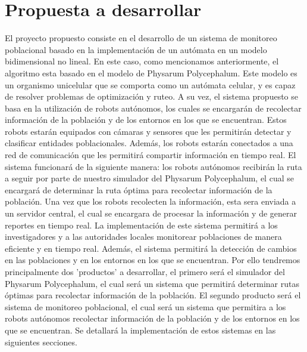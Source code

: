 \section{Propuesta a desarrollar}
\label{sec:Propuesta a desarrollar}
        El proyecto propuesto consiste en el desarrollo de un sistema de monitoreo poblacional basado en 
            la implementaci\'on de un aut\'omata en un modelo bidimensional no lineal. En este caso, 
            como mencionamos anteriormente, el algoritmo esta basado en el modelo de Physarum Polycephalum.
            Este modelo es un organismo unicelular que se comporta como un aut\'omata celular,
            y es capaz de resolver problemas de optimizaci\'on y ruteo.
        \vskip 0.5cm
        A su vez, el sistema propuesto se basa en la utilizaci\'on de robots aut\'onomos, los cuales 
            se encargar\'an de recolectar informaci\'on de la poblaci\'on y de los entornos en los que 
            se encuentran. Estos robots estar\'an equipados con c\'amaras y sensores que les permitir\'an 
            detectar y clasificar entidades poblacionales. Adem\'as, los robots estar\'an conectados a 
            una red de comunicaci\'on que les permitir\'a compartir informaci\'on en tiempo real.
        \vskip 0.5cm
        El sistema funcionar\'a de la siguiente manera: los robots aut\'onomos recibir\'an la ruta a seguir 
            por parte de nuestro simulador del Physarum Polycephalum, el cual se encargar\'a de determinar
            la ruta \'optima para recolectar informaci\'on de la poblaci\'on. Una vez que los robots
            recolecten la informaci\'on, esta sera enviada a un servidor central, el cual se encargara
            de procesar la informaci\'on y de generar reportes en tiempo real.
        \vskip 0.5cm
        La implementaci\'on de este sistema permitir\'a a los investigadores y a las autoridades locales
            monitorear poblaciones de manera eficiente y en tiempo real. Adem\'as, el sistema permitir\'a
            la detecci\'on de cambios en las poblaciones y en los entornos en los que se encuentran.
        \vskip 0.5cm
        Por ello tendremos principalmente dos 'productos' a desarrollar, el primero ser\'a el simulador
            del Physarum Polycephalum, el cual ser\'a un sistema que permitir\'a determinar rutas \'optimas
            para recolectar informaci\'on de la poblaci\'on. El segundo producto ser\'a el sistema de 
            monitoreo poblacional, el cual ser\'a un sistema que permitira a los robots aut\'onomos 
            recolectar informaci\'on de la poblaci\'on y de los entornos en los que se encuentran.
        \vskip 0.5cm
        Se detallar\'a la implementaci\'on de estos sistemas en las siguientes secciones.
    